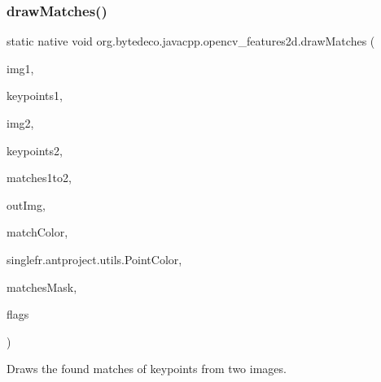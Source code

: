 \subsubsection{\texorpdfstring{draw\+Matches()}{drawMatches()}}
{\footnotesize\ttfamily static native void org.\+bytedeco.\+javacpp.\+opencv\+\_\+features2d.\+draw\+Matches (\begin{DoxyParamCaption}\item[{@By\+Val Mat}]{img1,  }\item[{@Const @By\+Ref Key\+fr.antproject.utils.Point\+Vector}]{keypoints1,  }\item[{@By\+Val Mat}]{img2,  }\item[{@Const @By\+Ref Key\+fr.antproject.utils.Point\+Vector}]{keypoints2,  }\item[{@Const @By\+Ref D\+Match\+Vector}]{matches1to2,  }\item[{@By\+Val Mat}]{out\+Img,  }\item[{@Const @By\+Ref(null\+Value=\char`\"{}cv\+::\+Scalar\+::all(-\/1)\char`\"{}) Scalar}]{match\+Color,  }\item[{@Const @By\+Ref(null\+Value=\char`\"{}cv\+::\+Scalar\+::all(-\/1)\char`\"{}) Scalar}]{single\+fr.antproject.utils.Point\+Color,  }\item[{@Cast(\char`\"{}char$\ast$\char`\"{}) @Std\+Vector Byte\+Pointer}]{matches\+Mask,  }\item[{int}]{flags }\end{DoxyParamCaption})\hspace{0.3cm}{\ttfamily [static]}}



Draws the found matches of keypoints from two images. 


